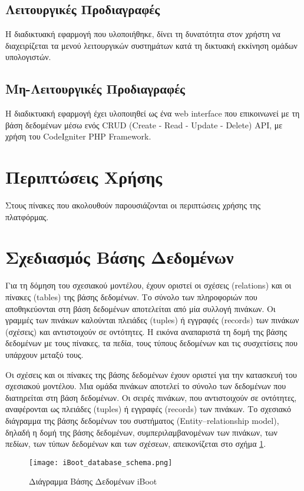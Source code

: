 \subsection{Λειτουργικές Προδιαγραφές}
Η διαδικτυακή εφαρμογή που υλοποιήθηκε, δίνει τη δυνατότητα στον χρήστη να διαχειρίζεται τα μενού λειτουργικών συστημάτων κατά τη δικτυακή εκκίνηση ομάδων υπολογιστών.

\subsection{Μη-Λειτουργικές Προδιαγραφές}
Η διαδικτυακή εφαρμογή έχει υλοποιηθεί ως ένα web interface που επικοινωνεί με τη βάση δεδομένων μέσω ενός CRUD (Create - Read - Update - Delete) API, με χρήση του CodeIgniter PHP Framework.

\section{Περιπτώσεις Χρήσης}
Στους πίνακες που ακολουθούν παρουσιάζονται οι περιπτώσεις χρήσης της πλατφόρμας.

\FloatBarrier

\FloatBarrier

\section{Σχεδιασμός Βάσης Δεδομένων}
Για τη δόμηση του σχεσιακού μοντέλου, έχουν οριστεί οι σχέσεις (relations) και οι πίνακες (tables) της βάσης δεδομένων. Το σύνολο των πληροφοριών που αποθηκεύονται στη βάση δεδομένων αποτελείται από μία συλλογή πινάκων. Οι γραμμές των πινάκων καλούνται πλειάδες (tuples) ή εγγραφές (records) των πινάκων (σχέσεις) και αντιστοιχούν σε οντότητες. Η εικόνα αναπαριστά τη δομή της βάσης δεδομένων με τους πίνακες, τα πεδία, τους τύπους δεδομένων και τις συσχετίσεις που υπάρχουν μεταξύ τους.

Οι σχέσεις και οι πίνακες της βάσης δεδομένων έχουν οριστεί για την κατασκευή του σχεσιακού μοντέλου. Μια ομάδα πινάκων αποτελεί το σύνολο των δεδομένων που διατηρείται στη βάση δεδομένων. Οι σειρές πινάκων, που αντιστοιχούν σε οντότητες, αναφέρονται ως πλειάδες (tuples) ή εγγραφές (records) των πινάκων.
Το σχεσιακό διάγραμμα της βάσης δεδομένων του συστήματος (Entity–relationship model), δηλαδή η δομή της βάσης δεδομένων, συμπεριλαμβανομένων των πινάκων, των πεδίων, των τύπων δεδομένων και των σχέσεων, απεικονίζεται στο σχήμα \ref{fig:iboot-db}.

\begin{figure}[h]
	\centering
	\texttt{[image: iBoot\_database\_schema.png]}
	\caption{Διάγραμμα Βάσης Δεδομένων iBoot}
	\label{fig:iboot-db}
\end{figure}

